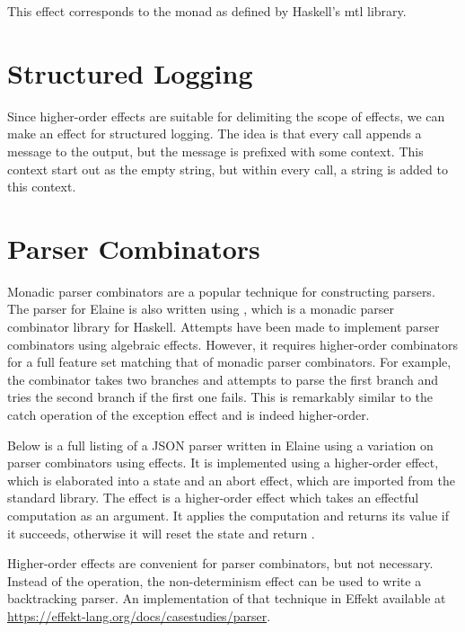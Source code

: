 This effect corresponds to the  monad as defined by Haskell's mtl library.


\section{Structured Logging}

Since higher-order effects are suitable for delimiting the scope of effects, we can make an effect for structured logging. The idea is that every  call appends a message to the output, but the message is prefixed with some context. This context start out as the empty string, but within every  call, a string is added to this context.


\section{Parser Combinators}

Monadic parser combinators \autocite{hutton_monadic_1996} are a popular technique for constructing parsers. The parser for Elaine is also written using , which is a monadic parser combinator library for Haskell. Attempts have been made to implement parser combinators using algebraic effects. However, it requires higher-order combinators for a full feature set matching that of monadic parser combinators. For example, the  combinator takes two branches and attempts to parse the first branch and tries the second branch if the first one fails. This is remarkably similar to the catch operation of the exception effect and is indeed higher-order.

Below is a full listing of a JSON parser written in Elaine using a variation on parser combinators using effects. It is implemented using a higher-order  effect, which is elaborated into a state and an abort effect, which are imported from the standard library. The  effect is a higher-order effect which takes an effectful computation as an argument. It applies the computation and returns its value if it succeeds, otherwise it will reset the state and return .

Higher-order effects are convenient for parser combinators, but not necessary. Instead of the  operation, the non-determinism effect can be used to write a backtracking parser. An implementation of that technique in Effekt available at \url{https://effekt-lang.org/docs/casestudies/parser}.

